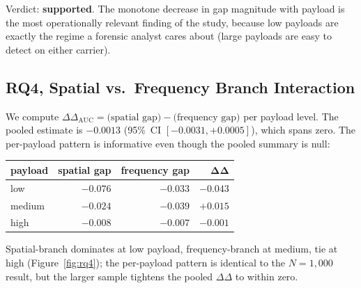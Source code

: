 \documentclass[10pt,twocolumn,a4paper]{article}
\begin{document}
Verdict: \textbf{supported}. The monotone decrease in gap magnitude with payload is the most operationally relevant finding of the study, because low payloads are exactly the regime a forensic analyst cares about (large payloads are easy to detect on either carrier).

\subsection{RQ4, Spatial vs.\ Frequency Branch Interaction}
\label{sec:rq4}

We compute $\Delta\Delta_\text{AUC}\!=\!\text{(spatial gap)}-\text{(frequency gap)}$ per payload level. The pooled estimate is $-0.0013$ (95\%~CI $[-0.0031,+0.0005]$), which spans zero. The per-payload pattern is informative even though the pooled summary is null:

\begin{center}\small
\begin{tabular}{lrrr}
\textbf{payload} & \textbf{spatial gap} & \textbf{frequency gap} & $\boldsymbol{\Delta\Delta}$ \\
\midrule
low    & $-0.076$ & $-0.033$ & $-0.043$ \\
medium & $-0.024$ & $-0.039$ & $+0.015$ \\
high   & $-0.008$ & $-0.007$ & $-0.001$ \\
\end{tabular}
\end{center}

Spatial-branch dominates at low payload, frequency-branch at medium, tie at high (Figure~\ref{fig:rq4}); the per-payload pattern is identical to the $N\!=\!1{,}000$ result, but the larger sample tightens the pooled $\Delta\Delta$ to within zero.
\end{document}

